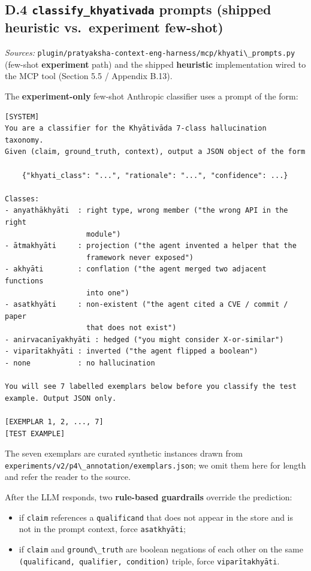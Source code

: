 \subsection{\texorpdfstring{D.4 \texttt{classify\_khyativada} prompts (shipped heuristic vs.~experiment few-shot)}{D.4 classify\_khyativada prompts (shipped heuristic vs.~experiment few-shot)}}\label{d.4-classify_khyativada-prompts-shipped-heuristic-vs.-experiment-few-shot}

\emph{Sources:} \passthrough{\lstinline!plugin/pratyaksha-context-eng-harness/mcp/khyati\_prompts.py!} (few-shot \textbf{experiment} path) and the shipped \textbf{heuristic} implementation wired to the MCP tool (Section 5.5 / Appendix B.13).

The \textbf{experiment-only} few-shot Anthropic classifier uses a prompt of the form:

\begin{lstlisting}
[SYSTEM]
You are a classifier for the Khyātivāda 7-class hallucination taxonomy.
Given (claim, ground_truth, context), output a JSON object of the form

    {"khyati_class": "...", "rationale": "...", "confidence": ...}

Classes:
- anyathākhyāti  : right type, wrong member ("the wrong API in the right
                   module")
- ātmakhyāti     : projection ("the agent invented a helper that the
                   framework never exposed")
- akhyāti        : conflation ("the agent merged two adjacent functions
                   into one")
- asatkhyāti     : non-existent ("the agent cited a CVE / commit / paper
                   that does not exist")
- anirvacanīyakhyāti : hedged ("you might consider X-or-similar")
- viparītakhyāti : inverted ("the agent flipped a boolean")
- none           : no hallucination

You will see 7 labelled exemplars below before you classify the test
example. Output JSON only.

[EXEMPLAR 1, 2, ..., 7]
[TEST EXAMPLE]
\end{lstlisting}

The seven exemplars are curated synthetic instances drawn from \passthrough{\lstinline!experiments/v2/p4\_annotation/exemplars.json!}; we omit them here for length and refer the reader to the source.

After the LLM responds, two \textbf{rule-based guardrails} override the prediction:

\begin{itemize}
\tightlist
\item
  if \passthrough{\lstinline!claim!} references a \passthrough{\lstinline!qualificand!} that does not appear in the
  store and is not in the prompt context, force \passthrough{\lstinline!asatkhyāti!};
\item
  if \passthrough{\lstinline!claim!} and \passthrough{\lstinline!ground\_truth!} are boolean negations of each other
  on the same \passthrough{\lstinline!(qualificand, qualifier, condition)!} triple, force
  \passthrough{\lstinline!viparītakhyāti!}.
\end{itemize}

